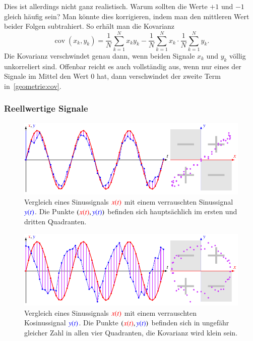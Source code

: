 Dies ist allerdings nicht ganz realistisch.
Warum sollten die Werte $+1$ und $-1$ gleich häufig sein?
Man könnte dies korrigieren, indem man den mittleren Wert beider Folgen
subtrahiert.
So erhält man die Kovarianz
%
\begin{equation}
\operatorname{cov}(x_k,y_k)
=
\frac1{N} \sum_{k=1}^N x_ky_k
-
\frac1{N} \sum_{k=1}^N x_k
\cdot
\frac1{N} \sum_{k=1}^N y_k.
\label{geometrie:cov}
\end{equation}
Die Kovarianz verschwindet genau dann, wenn beiden Signale $x_k$ und $y_k$
völlig unkorreliert sind.
Offenbar reicht es auch vollständig aus, wenn nur eines der Signale
im Mittel den Wert $0$ hat, dann verschwindet der zweite Term
in~\eqref{geometrie:cov}.

\subsubsection{Reellwertige Signale}
\begin{figure}
\centering
\includegraphics[width=\hsize]{chapters/1-geometrie/images/sinsin.pdf}
\caption{Vergleich eines Sinussignals $\color{red}x(t)$ mit einem
verrauschten Sinussignal $\color{blue}y(t)$.
Die Punkte $({\color{red}x(t)},{\color{blue}y(t)})$ befinden sich
hauptsächlich im ersten und dritten Quadranten.
\label{geometrie:kovarianz:sinsin:image}}
\end{figure}
\begin{figure}
\centering
\includegraphics[width=\hsize]{chapters/1-geometrie/images/sincos.pdf}
\caption{Vergleich eines Sinussignals $\color{red}x(t)$ mit einem
verrauschten Kosinussignal $\color{blue}y(t)$.
Die Punkte $({\color{red}x(t)},{\color{blue}y(t)})$ befinden sich
in ungefähr gleicher Zahl in allen vier Quadranten, die Kovarianz
wird klein sein.
\label{geometrie:kovarianz:sincos:image}}
\end{figure}
